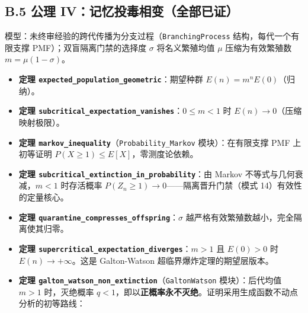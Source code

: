 \subsection{B.5 公理
IV：记忆投毒相变（全部已证）}\label{b.5-ux516cux7406-ivux8bb0ux5fc6ux6295ux6bd2ux76f8ux53d8ux5168ux90e8ux5df2ux8bc1}

模型：未终审经验的跨代传播为分支过程（\texttt{BranchingProcess}
结构，每代一个有限支撑 PMF）；双盲隔离门禁的选择度 \(\sigma\)
将名义繁殖均值 \(\mu\) 压缩为有效繁殖数 \(m = \mu(1-\sigma)\)。

\begin{itemize}
\tightlist
\item
  \textbf{定理 \texttt{expected\_population\_geometric}}：期望种群
  \(E(n) = m^n E(0)\)（归纳）。
\item
  \textbf{定理
  \texttt{subcritical\_expectation\_vanishes}}：\(0 \le m < 1\) 时
  \(E(n) \to 0\)（压缩映射极限）。
\item
  \textbf{定理
  \texttt{markov\_inequality}}（\texttt{Probability\_Markov}
  模块）：在有限支撑 PMF 上初等证明
  \(P(X \ge 1) \le E[X]\)，零测度论依赖。
\item
  \textbf{定理 \texttt{subcritical\_extinction\_in\_probability}}：由
  Markov 不等式与几何衰减，\(m<1\) 时存活概率
  \(P(Z_n \ge 1) \to 0\)------隔离晋升门禁（模式 14）有效性的定量核心。
\item
  \textbf{定理 \texttt{quarantine\_compresses\_offspring}}：\(\sigma\)
  越严格有效繁殖数越小，完全隔离使其归零。
\item
  \textbf{定理 \texttt{supercritical\_expectation\_diverges}}：\(m>1\)
  且 \(E(0)>0\) 时 \(E(n) \to +\infty\)。这是 Galton-Watson
  超临界爆炸定理的期望层版本。
\item
  \textbf{定理
  \texttt{galton\_watson\_non\_extinction}}（\texttt{GaltonWatson}
  模块）：后代均值 \(m>1\) 时，灭绝概率
  \(q < 1\)，即以\textbf{正概率永不灭绝}。证明采用生成函数不动点分析的初等路线：


\end{itemize}
